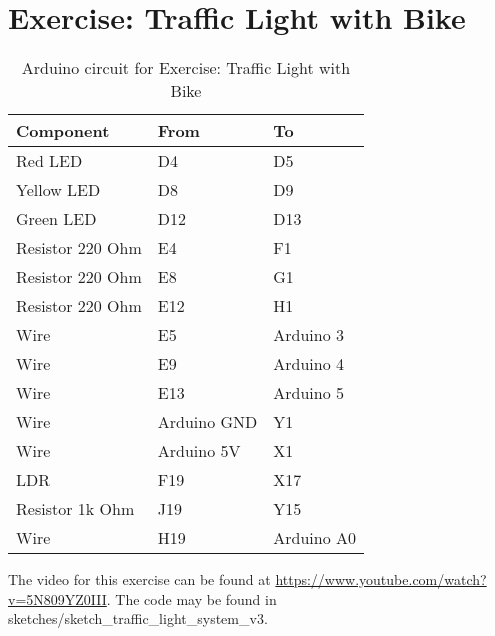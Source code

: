 \part*{Exercise: Traffic Light with Bike}
\begin{table}[H]
	\centering
	\caption{Arduino circuit for Exercise: Traffic Light with Bike}
	\label{my-label}
	\begin{tabular}{|l|l|l|}
		\hline
		Component        & From        & To         \\ \hline
		Red LED          & D4          & D5         \\ \hline
		Yellow LED       & D8          & D9         \\ \hline
		Green LED        & D12         & D13        \\ \hline
		Resistor 220 Ohm & E4          & F1         \\ \hline
		Resistor 220 Ohm & E8          & G1         \\ \hline
		Resistor 220 Ohm & E12         & H1         \\ \hline
		Wire             & E5          & Arduino 3  \\ \hline
		Wire             & E9          & Arduino 4  \\ \hline
		Wire             & E13         & Arduino 5  \\ \hline
		Wire             & Arduino GND & Y1         \\ \hline
		Wire             & Arduino 5V  & X1         \\ \hline
		LDR              & F19         & X17        \\ \hline
		Resistor 1k Ohm  & J19         & Y15        \\ \hline
		Wire             & H19         & Arduino A0 \\ \hline
	\end{tabular}
\end{table}
The video for this exercise can be found at \url{https://www.youtube.com/watch?v=5N809YZ0III}. The code may be found in sketches/sketch\_traffic\_light\_system\_v3.
